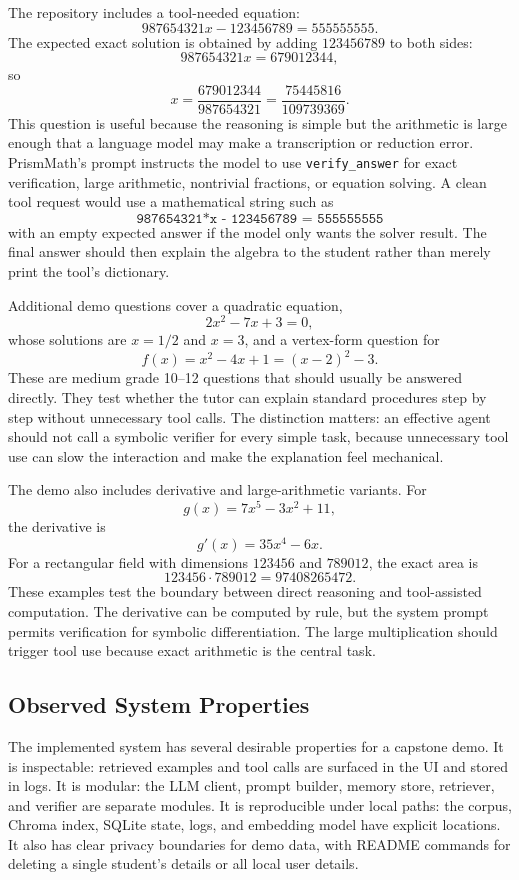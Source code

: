 The repository includes a tool-needed equation:
\[
    987654321x - 123456789 = 555555555.
\]
The expected exact solution is obtained by adding $123456789$ to both sides:
\[
    987654321x=679012344,
\]
so
\[
    x=\frac{679012344}{987654321}
    =\frac{75445816}{109739369}.
\]
This question is useful because the reasoning is simple but the arithmetic is large enough that a language model may make a transcription or reduction error. PrismMath's prompt instructs the model to use \texttt{verify\_answer} for exact verification, large arithmetic, nontrivial fractions, or equation solving. A clean tool request would use a mathematical string such as
\[
\texttt{987654321*x - 123456789 = 555555555}
\]
with an empty expected answer if the model only wants the solver result. The final answer should then explain the algebra to the student rather than merely print the tool's dictionary.

Additional demo questions cover a quadratic equation,
\[
    2x^2-7x+3=0,
\]
whose solutions are $x=1/2$ and $x=3$, and a vertex-form question for
\[
    f(x)=x^2-4x+1=(x-2)^2-3.
\]
These are medium grade 10--12 questions that should usually be answered directly. They test whether the tutor can explain standard procedures step by step without unnecessary tool calls. The distinction matters: an effective agent should not call a symbolic verifier for every simple task, because unnecessary tool use can slow the interaction and make the explanation feel mechanical.

The demo also includes derivative and large-arithmetic variants. For
\[
    g(x)=7x^5-3x^2+11,
\]
the derivative is
\[
    g'(x)=35x^4-6x.
\]
For a rectangular field with dimensions $123456$ and $789012$, the exact area is
\[
    123456\cdot 789012=97408265472.
\]
These examples test the boundary between direct reasoning and tool-assisted computation. The derivative can be computed by rule, but the system prompt permits verification for symbolic differentiation. The large multiplication should trigger tool use because exact arithmetic is the central task.

\subsection{Observed System Properties}

The implemented system has several desirable properties for a capstone demo. It is inspectable: retrieved examples and tool calls are surfaced in the UI and stored in logs. It is modular: the LLM client, prompt builder, memory store, retriever, and verifier are separate modules. It is reproducible under local paths: the corpus, Chroma index, SQLite state, logs, and embedding model have explicit locations. It also has clear privacy boundaries for demo data, with README commands for deleting a single student's details or all local user details.


